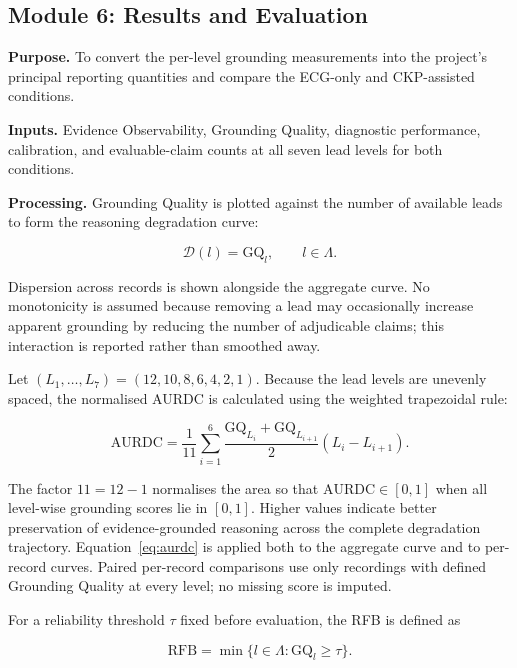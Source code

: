 \documentclass{ssnreview}
\begin{document}
\subsection{Module 6: Results and Evaluation}

\textbf{Purpose.} To convert the per-level grounding measurements into the project’s
principal reporting quantities and compare the ECG-only and CKP-assisted conditions.

\textbf{Inputs.} Evidence Observability, Grounding Quality, diagnostic performance,
calibration, and evaluable-claim counts at all seven lead levels for both conditions.

\textbf{Processing.} Grounding Quality is plotted against the number of available leads
to form the reasoning degradation curve:

\begin{equation}
  \mathcal{D}(l)=\mathrm{GQ}_l,\qquad l\in\Lambda.
  \label{eq:degradation-curve}
\end{equation}

Dispersion across records is shown alongside the aggregate curve. No monotonicity is
assumed because removing a lead may occasionally increase apparent grounding by reducing
the number of adjudicable claims; this interaction is reported rather than smoothed away.

Let $(L_1,\ldots,L_7)=(12,10,8,6,4,2,1)$. Because the lead levels are unevenly
spaced, the normalised AURDC is calculated using the weighted trapezoidal rule:

\begin{equation}
  \mathrm{AURDC}
  =\frac{1}{11}\sum_{i=1}^{6}
  \frac{\mathrm{GQ}_{L_i}+\mathrm{GQ}_{L_{i+1}}}{2}
  (L_i-L_{i+1}).
  \label{eq:aurdc}
\end{equation}

The factor $11=12-1$ normalises the area so that
$\mathrm{AURDC}\in[0,1]$ when all level-wise grounding scores lie in $[0,1]$.
Higher values indicate better preservation of evidence-grounded reasoning across the
complete degradation trajectory. Equation~\ref{eq:aurdc} is applied both to the aggregate
curve and to per-record curves. Paired per-record comparisons use only recordings with
defined Grounding Quality at every level; no missing score is imputed.

For a reliability threshold $\tau$ fixed before evaluation, the RFB is defined as

\begin{equation}
  \mathrm{RFB}
  =\min\{l\in\Lambda:\mathrm{GQ}_l\geq\tau\}.
  \label{eq:rfb}
\end{equation}
\end{document}
